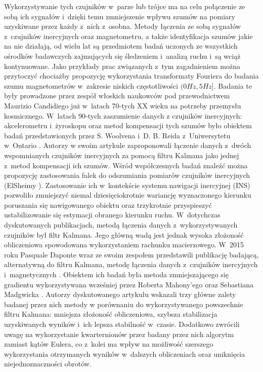 Wykorzystywanie tych czujników w~parze lub trójce ma na celu połączenie ze sobą ich sygnałów i~dzięki temu zmniejszenie wpływu szumów na pomiary uzyskiwane przez każdy z~nich z~osobna. Metody łączenia ze sobą sygnałów z~czujników inercyjnych oraz magnetometru, a także identyfikacja szumów jakie na nie działają, od wielu lat są przedmiotem badań uczonych ze wszystkich ośrodków badawczych zajmujących się śledzeniem i~analizą ruchu i~są wciąż kontynuowane. Jako przykłady prac związanych z~tym zagadnieniem można przytoczyć chociażby propozycję wykorzystania transformaty Fouriera do badania szumu magnetometrów w~zakresie niskich częstotliwości $(0Hz, 5Hz]$. Badania te były prowadzone przez zespół włoskich naukowców pod przewodnictwem Maurizio Candidiego już w~latach 70-tych XX wieku \cite{Candidi1974} na potrzeby przemysłu kosmicznego. W~latach 90-tych zaszumienie danych z czujników inercyjnych: akcelerometru i~żyroskopu oraz metod kompensacji tych szumów było obiektem badań przedstawionych przez S. Woolvena i~D. B. Reida z~Uniwersytetu w~Ontario \cite{Woolven1994}. Autorzy w swoim artykule zaproponowali łączenie danych z~dwóch wspomnianych czujników inercyjnych za pomocą filtru Kalmana jako jednej z~metod kompensacji ich szumów. Wśród współczesnych badań znaleźć można propozycję zastosowania falek do odszumiania pomiarów czujników inercyjnych (ElSheimy  \cite{ElSheimy2004}). Zastosowanie ich w~kontekście systemu nawigacji inercyjnej (INS) pozwoliło zmniejszyć niemal dziesięciokrotnie wariancję wyznaczonego kierunku poruszania się nawigowanego obiektu oraz trzykrotnie przyspieszyć ustabilizowanie się estymacji obranego kierunku ruchu. W~dotychczas dyskutowanych publikacjach, metodą łączenia danych z~wykorzystywanych czujników był filtr Kalmana. Jego główną wadą jest jednak wysoka złożoność obliczeniowa spowodowana wykorzystaniem rachunku macierzowego. W~2015 roku Pasquale Daponte wraz ze swoim zespołem przedstawili publikację badającą, alternatywną do filtru Kalmana, metodę łączenia danych z~czujników inercyjnych i~magnetycznych \cite{Daponte2015}. Obiektem ich badań była metoda zmniejszającego się gradientu wykorzystywana wcześniej przez Roberta Mahony'ego \cite{Mahony2005a} oraz Sebastiana Madgwicka \cite{Madgwick2011}. Autorzy dyskutowanego artykułu wskazali trzy główne zalety badanej przez nich metody w porównaniu do wykorzystywanego powszechnie filtru Kalmana: mniejsza złożoność obliczeniowa, szybsza stabilizacja uzyskiwanych wyników i~ich lepsza stabilność w~czasie. Dodatkowo zwrócili uwagę na wykorzystanie kwarternionów przez badany przez nich algorytm zamiast kątów Eulera, co z~kolei ma wpływ na możliwość szerszego wykorzystania otrzymanych wyników w~dalszych obliczeniach oraz uniknięcia niejednoznaczności obrotów. \\

